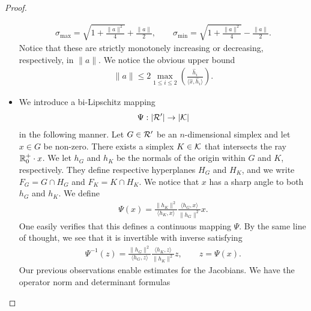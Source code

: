 \documentclass[10pt,letterpaper]{article}
\begin{document}
\begin{proof}
\begin{itemize}
        \begin{align*}
            \sigma_{\max} = \sqrt{ 1 + \frac{ \|a\|^{2} }{ 4 } } + \frac{ \|a\| }{2},
            \qquad 
            \sigma_{\min} = \sqrt{ 1 + \frac{ \|a\|^{2} }{ 4 } } - \frac{ \|a\| }{2}.     
        \end{align*}
        Notice that these are strictly monotonely increasing or decreasing, respectively, in $\|a\|$.
        We notice the obvious upper bound 
        \begin{align*}
            \|a\| 
            \leq 
            2 \max_{1 \leq i \leq 2} 
            \left( 
                \frac{ \hat h_i }{ \langle \hat x, \hat h_i \rangle } 
            \right)
            .
        \end{align*}

        \item 
        We introduce a bi-Lipschitz mapping 
        \begin{align*}
            \Psi : |{\mathcal R}'| \rightarrow |{\mathcal K}|
        \end{align*}
        in the following manner. Let ${G} \in {\mathcal R}'$ be an $n$-dimensional simplex and let $x \in {G}$ be non-zero. There exists a simplex $K \in {\mathcal K}$ that intersects the ray ${\mathbb R}_0^+ \cdot x$. We let $h_{{G}}$ and $h_{K}$ be the normals of the origin within ${G}$ and $K$, respectively. They define respective hyperplanes $H_{G}$ and $H_{K}$,
        and we write $F_{G} = G \cap H_{G}$ and $F_{K} = K \cap H_{K}$. 
        We notice that $x$ has a sharp angle to both $h_{{G}}$ and $h_{K}$. 
        We define 
        \begin{align*}
            \Psi(x) 
            = 
            \frac{ \| h_K \|^{2} }{ \langle h_K, x \rangle }
            \frac{ \langle h_{{G}}, x \rangle }{ \| h_{{G}} \|^{2} }
            x
            .
        \end{align*}
        One easily verifies that this defines a continuous mapping $\Psi$. 
        By the same line of thought, we see that it is invertible with inverse satisfying 
        \begin{align*}
            \Psi^{-1}(z) 
            = 
            \frac{ \| h_{{G}} \|^{2} }{ \langle h_{{G}}, z \rangle }
            \frac{ \langle h_K, z \rangle }{ \| h_K \|^{2} }
            z,
            \qquad 
            z = \Psi(x)
            .
        \end{align*}
        Our previous observations enable estimates for the Jacobians. 
        We have the operator norm and determinant formulas 

\end{itemize}
\end{proof}
\end{document}
